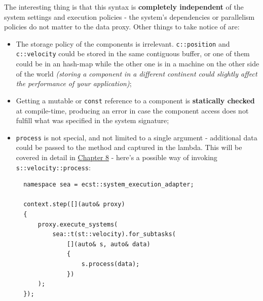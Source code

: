 \documentclass[twoside, 12pt, a4paper, openany]{book}
\begin{document}
The interesting thing is that this syntax is \textbf{completely
independent} of the system settings and execution policies - the
system's dependencies or parallelism policies do not matter to the data
proxy. Other things to take notice of are:

\begin{itemize}
\item
  The storage policy of the components is irrelevant.
  \texttt{c::position}
  and
  \texttt{c::velocity}
  could be stored in the same contiguous buffer, or one of them could be
  in an hash-map while the other one is in a machine on the other side
  of the world \emph{(storing a component in a different continent could
  slightly affect the performance of your application)};
\item
  Getting a mutable or
  \texttt{const}
  reference to a component is \textbf{statically checked} at
  compile-time, producing an error in case the component access does not
  fulfill what was specified in the system signature;
\item
  \texttt{process}
  is not special, and not limited to a single argument - additional data
  could be passed to the method and captured in the lambda. This will be
  covered in detail in \protect\hyperlink{chap_flow}{Chapter 8} - here's
  a possible way of invoking
  \texttt{s::velocity::process}:

  \begin{verbatim}
  namespace sea = ecst::system_execution_adapter;

  context.step([](auto& proxy)
  {
      proxy.execute_systems(
          sea::t(st::velocity).for_subtasks(
              [](auto& s, auto& data)
              {
                  s.process(data);
              })
      );
  });
  \end{verbatim}
\end{itemize}
\end{document}
